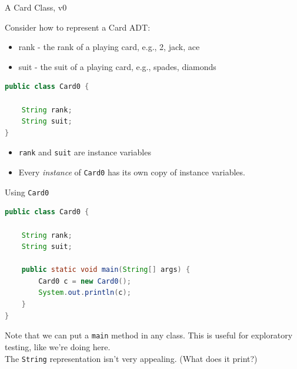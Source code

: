 \documentclass{beamer}
\begin{document}
\begin{frame}[fragile]{A Card Class, v0}



Consider how to represent a Card ADT:
\begin{itemize}
\item rank - the rank of a playing card, e.g., 2, jack, ace
\item suit - the suit of a playing card, e.g., spades, diamonds
\end{itemize}

\begin{lstlisting}[language=Java]
public class Card0 {

    String rank;
    String suit;
}
\end{lstlisting}

\begin{itemize}
\item {\tt rank} and {\tt suit} are instance variables
\item Every {\it instance} of {\tt Card0} has its own copy of instance variables.
\end{itemize}

\end{frame}

\begin{frame}[fragile]{Using {\tt Card0}}



\begin{lstlisting}[language=Java]
public class Card0 {

    String rank;
    String suit;

    public static void main(String[] args) {
        Card0 c = new Card0();
        System.out.println(c);
    }
}
\end{lstlisting}

Note that we can put a {\tt main} method in any class. This is useful for exploratory testing, like we're doing here.\\
\vspace{.1in}
The {\tt String} representation isn't very appealing.  (What does it print?)

\end{frame}
\end{document}
